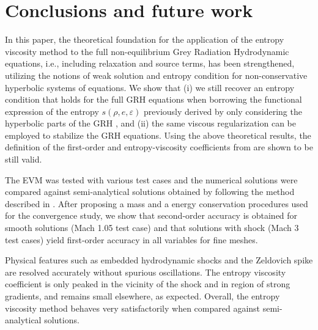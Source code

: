 \documentclass[times,doublespace]{fldauth}%
\begin{document}
\section{Conclusions and future work}
In this paper, the theoretical foundation for the application of the entropy viscosity method to the full non-equilibrium Grey Radiation Hydrodynamic equations, i.e., including relaxation and source terms, has been strengthened, utilizing the notions of weak solution and entropy condition for non-conservative hyperbolic systems of equations. We show that 
(i) we still recover an entropy condition that holds for the full GRH equations when borrowing the functional expression of the entropy  $s(\rho,e,\varepsilon)$ previously derived by only considering the hyperbolic parts of the GRH \cite{our_jcp_radhy_paper}, and
(ii) the same viscous regularization can be employed to stabilize the GRH equations.
Using the above theoretical results, the definition of the first-order and entropy-viscosity coefficients from \cite{our_jcp_radhy_paper} are shown to be still valid. 

The EVM was tested with various test cases and the numerical solutions were compared against semi-analytical solutions obtained by following the method described in \cite{LowrieEdwards}. After proposing a mass and a energy conservation procedures used for the convergence study, we show that second-order accuracy is obtained for smooth solutions (Mach 1.05 test case) and that solutions with shock (Mach 3 test cases) yield first-order accuracy in all variables for fine meshes. 

Physical features such as embedded hydrodynamic shocks and the Zeldovich spike are resolved accurately without spurious oscillations. The entropy viscosity coefficient is only peaked in the vicinity of the shock and in region of strong gradients, and remains small elsewhere, as expected. Overall, the entropy viscosity method behaves very satisfactorily when compared against semi-analytical solutions.
\end{document}
